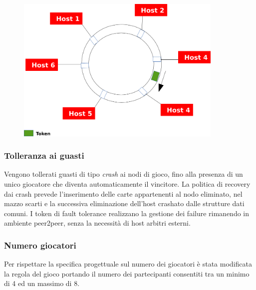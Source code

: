 \documentclass[10pt,a4paper]{article}
\begin{document}
\begin{figure}[H]
\begin{center}
\includegraphics[height=7cm, keepaspectratio]{token-ring.png}
\end{center}
\end{figure}

\subsubsection{Tolleranza ai guasti}
Vengono tollerati guasti di tipo \textit{crash} ai nodi di gioco, fino alla presenza di un unico giocatore che diventa automaticamente il vincitore. La politica di recovery dai crash prevede l'inserimento delle carte appartenenti al nodo eliminato, nel mazzo scarti e la successiva eliminazione dell'host crashato dalle strutture dati comuni. I token di fault tolerance realizzano la gestione dei failure rimanendo in ambiente peer2peer, senza la necessità di host arbitri esterni.  

\subsubsection{Numero giocatori}
Per rispettare la specifica progettuale sul numero dei giocatori è stata modificata la regola del gioco portando il numero dei partecipanti consentiti tra un minimo di 4 ed un massimo di 8. 

\end{document}
